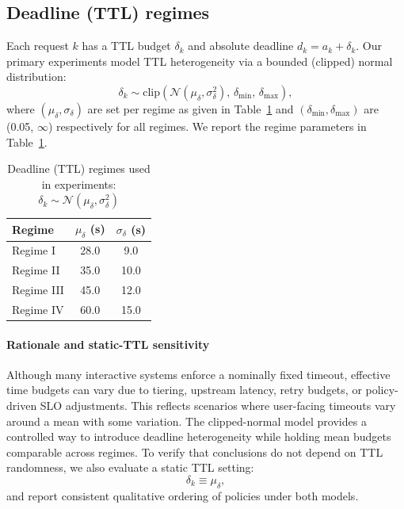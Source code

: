 \documentclass[fleqn,12pt,lineno]{wlpeerj}
\begin{document}
\subsection{Deadline (TTL) regimes}
\label{sec:ttl_model}

Each request $k$ has a TTL budget $\delta_k$ and absolute deadline $d_k=a_k+\delta_k$. Our primary experiments model TTL heterogeneity via a bounded (clipped) normal distribution:
\begin{equation}
\delta_k \sim \mathrm{clip}\!\left(\mathcal{N}(\mu_\delta,\sigma_\delta^2),\, \delta_{\min},\, \delta_{\max}\right),
\label{eq:ttl_clipped_normal}
\end{equation}
where $(\mu_\delta,\sigma_\delta)$ are set per regime as given in Table~\ref{tab:ttl_regimes} and $(\delta_{\min},\delta_{\max})$ are (0.05, $\infty$) respectively for all regimes. We report the regime parameters in Table~\ref{tab:ttl_regimes}.

\begin{table}[t]
\centering
\caption{Deadline (TTL) regimes used in experiments: $\delta_k\sim\mathcal{N}(\mu_\delta,\sigma_\delta^2)$}
\label{tab:ttl_regimes}
\begin{tabular}{lcc}
\toprule
Regime & $\mu_\delta$ (s) & $\sigma_\delta$ (s) \\
\midrule
Regime I   & 28.0 & 9.0  \\
Regime II  & 35.0 & 10.0 \\
Regime III & 45.0 & 12.0 \\
Regime IV  & 60.0 & 15.0 \\
\bottomrule
\end{tabular}
\end{table}

\paragraph{Rationale and static-TTL sensitivity}
Although many interactive systems enforce a nominally fixed timeout, effective time budgets can vary due to tiering, upstream latency, retry budgets, or policy-driven SLO adjustments. This reflects scenarios where user-facing timeouts vary around a mean with some variation. The clipped-normal model provides a controlled way to introduce deadline heterogeneity while holding mean budgets comparable across regimes. To verify that conclusions do not depend on TTL randomness, we also evaluate a static TTL setting:
\begin{equation}
\delta_k \equiv \mu_\delta,
\label{eq:ttl_static}
\end{equation}
and report consistent qualitative ordering of policies under both models.
\end{document}
